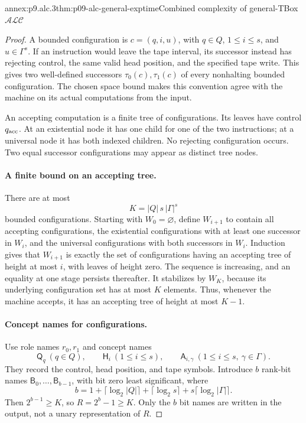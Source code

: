 \begin{annexitem}{annex:p9.alc.3}{thm:p09-alc-general-exptime}{Combined complexity of general-TBox \(\mathcal{ALC}\)}
\begin{proof}
A bounded configuration is \(c=(q,i,u)\), with \(q\in Q\),
\(1\leq i\leq s\), and \(u\in\Gamma^s\).
If an instruction would leave the tape interval, its successor
instead has rejecting control, the same valid head position, and
the specified tape write.
This gives two well-defined successors \(\tau_0(c),\tau_1(c)\)
of every nonhalting bounded configuration.
The chosen space bound makes this convention agree with the machine
on its actual computations from the input.

An accepting computation is a finite tree of configurations.
Its leaves have control \(q_{\rm acc}\).
At an existential node it has one child for one of the two
instructions; at a universal node it has both indexed children.
No rejecting configuration occurs.
Two equal successor configurations may appear as distinct tree nodes.

\paragraph{A finite bound on an accepting tree.}
There are at most
\[
 K=|Q|\,s\,|\Gamma|^s
\]
bounded configurations.
Starting with \(W_0=\varnothing\), define \(W_{i+1}\) to contain
all accepting configurations, the existential configurations with
at least one successor in \(W_i\), and the universal configurations
with both successors in \(W_i\).
Induction gives that \(W_{i+1}\) is exactly the set of configurations
having an accepting tree of height at most \(i\), with leaves of
height zero.
The sequence is increasing, and an equality at one stage persists
thereafter.  It stabilizes by \(W_K\), because its underlying
configuration set has at most \(K\) elements.
Thus, whenever the machine accepts, it has an accepting tree of
height at most \(K-1\).

\paragraph{Concept names for configurations.}
Use role names \(r_0,r_1\) and concept names
\[
 \mathsf Q_q\ (q\in Q),\qquad
 \mathsf H_i\ (1\leq i\leq s),\qquad
 \mathsf A_{i,\gamma}\ (1\leq i\leq s,\ \gamma\in\Gamma).
\]
They record the control, head position, and tape symbols.
Introduce \(b\) rank-bit names \(\mathsf B_0,\ldots,\mathsf B_{b-1}\),
with bit zero least significant, where
\[
 b=1+\lceil\log_2|Q|\rceil+\lceil\log_2s\rceil
                                  +s\lceil\log_2|\Gamma|\rceil.
\]
Then \(2^{b-1}\geq K\), so \(R=2^b-1\geq K\).
Only the \(b\) bit names are written in the output, not a unary
representation of \(R\).


\end{proof}
\end{annexitem}
